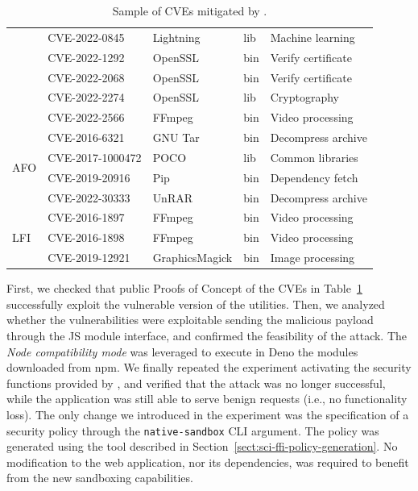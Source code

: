 \begin{table}[!t]
\begin{tabular*}{0.85\columnwidth}{ l l l l l}
							& CVE-2022-0845    & Lightning      & lib & Machine learning    \\
						    & CVE-2022-1292    & OpenSSL        & bin & Verify certificate  \\
						    & CVE-2022-2068    & OpenSSL        & bin & Verify certificate  \\
						    & CVE-2022-2274    & OpenSSL        & lib & Cryptography        \\
						    & CVE-2022-2566    & FFmpeg         & bin & Video processing    \\
	  \midrule
	  \multirow{4}{*}{AFO}  & CVE-2016-6321    & GNU Tar        & bin & Decompress archive  \\
							& CVE-2017-1000472 & POCO           & lib & Common libraries    \\
						    & CVE-2019-20916   & Pip            & bin & Dependency fetch    \\
						    & CVE-2022-30333   & UnRAR          & bin & Decompress archive  \\
	  \midrule
	  \multirow{3}{*}{LFI}  & CVE-2016-1897    & FFmpeg         & bin & Video processing    \\
						    & CVE-2016-1898    & FFmpeg         & bin & Video processing    \\
						    & CVE-2019-12921   & GraphicsMagick & bin & Image processing    \\
	  \bottomrule
	\end{tabular*}
	\caption{\label{table-cve} Sample of CVEs mitigated by \natisand.}
\end{table}


First, we checked that public Proofs of Concept of the CVEs in
Table~\ref{table-cve} successfully exploit the vulnerable version of
the utilities. Then, we analyzed whether the vulnerabilities were
exploitable sending the malicious payload through the JS module
interface, and confirmed the feasibility of the attack. The {\em Node
  compatibility mode} was leveraged to execute in Deno the modules
downloaded from npm. We finally repeated the experiment activating the
security functions provided by \natisand, and verified that the attack was
no longer successful, while the application was still able to serve
benign requests (i.e., no functionality loss). The only change we
introduced in the experiment was the specification of a security
policy through the {\tt native-sandbox} CLI argument. The policy was
generated using the tool described in
Section~\ref{sect:sci-ffi-policy-generation}. No modification to the
web application, nor its dependencies, was required to benefit from
the new sandboxing capabilities.


